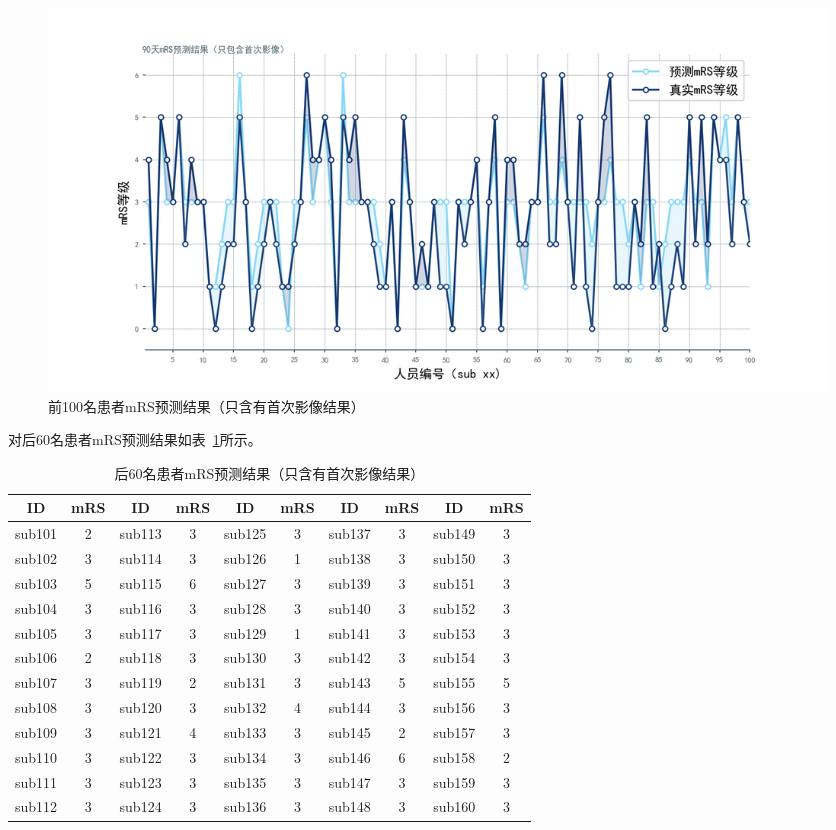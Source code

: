 \documentclass[bwprint]{gmcmthesis}
\begin{document}
\begin{figure}[h] %
  \centering %
  \includegraphics[width=\textwidth]{fig_me/90天mRS预测结果只包含首次影像.png}
  \caption{前100名患者mRS预测结果（只含有首次影像结果）}
  \label{前100名患者mRS预测结果（只含有首次影像结果）}
\end{figure}

对后60名患者mRS预测结果如表~\ref{后60名患者mRS预测结果（只含有首次影像结果）}所示。

\begin{table}[ht]
\caption{后60名患者mRS预测结果（只含有首次影像结果）}
\label{后60名患者mRS预测结果（只含有首次影像结果）}
\centering
\begin{tabular}{cccccccccc}
    \hline
        ID & mRS & ID & mRS & ID & mRS & ID & mRS & ID & mRS \\ \hline
        sub101 & 2 & sub113 & 3 & sub125 & 3 & sub137 & 3 & sub149 & 3 \\ 
        sub102 & 3 & sub114 & 3 & sub126 & 1 & sub138 & 3 & sub150 & 3 \\ 
        sub103 & 5 & sub115 & 6 & sub127 & 3 & sub139 & 3 & sub151 & 3 \\ 
        sub104 & 3 & sub116 & 3 & sub128 & 3 & sub140 & 3 & sub152 & 3 \\ 
        sub105 & 3 & sub117 & 3 & sub129 & 1 & sub141 & 3 & sub153 & 3 \\ 
        sub106 & 2 & sub118 & 3 & sub130 & 3 & sub142 & 3 & sub154 & 3 \\ 
        sub107 & 3 & sub119 & 2 & sub131 & 3 & sub143 & 5 & sub155 & 5 \\ 
        sub108 & 3 & sub120 & 3 & sub132 & 4 & sub144 & 3 & sub156 & 3 \\ 
        sub109 & 3 & sub121 & 4 & sub133 & 3 & sub145 & 2 & sub157 & 3 \\ 
        sub110 & 3 & sub122 & 3 & sub134 & 3 & sub146 & 6 & sub158 & 2 \\ 
        sub111 & 3 & sub123 & 3 & sub135 & 3 & sub147 & 3 & sub159 & 3 \\ 
        sub112 & 3 & sub124 & 3 & sub136 & 3 & sub148 & 3 & sub160 & 3 \\ \hline
    \end{tabular}
\end{table}
\end{document}
